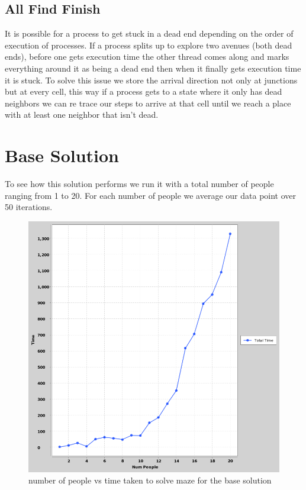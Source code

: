 \documentclass[a4paper, 12pt]{article}
\begin{document}
		\subsection{All Find Finish}
			It is possible for a process to get stuck in a dead end depending on the order of execution of processes. If a process splits up to explore two avenues (both dead ends), before one gets execution time the other thread comes along and marks everything around it as being a dead end then when it finally gets execution time it is stuck. To solve this issue we store the arrival direction not only at junctions but at every cell, this way if a process gets to a state where it only has dead neighbors we can re trace our steps to arrive at that cell until we reach a place with at least one neighbor that isn't dead.
		
  	
  	\section{Base Solution}
		To see how this solution performs we run it with a total number of people ranging from 1 to 20. For each number of people we average our data point over 50 iterations.
		
		\begin{figure}[H]
			\centering
			\includegraphics[scale=0.4]{numpeople-vs-time(base-solution)}
			\caption{number of people vs time taken to solve maze for the base solution}
		\end{figure}
		
\end{document}

